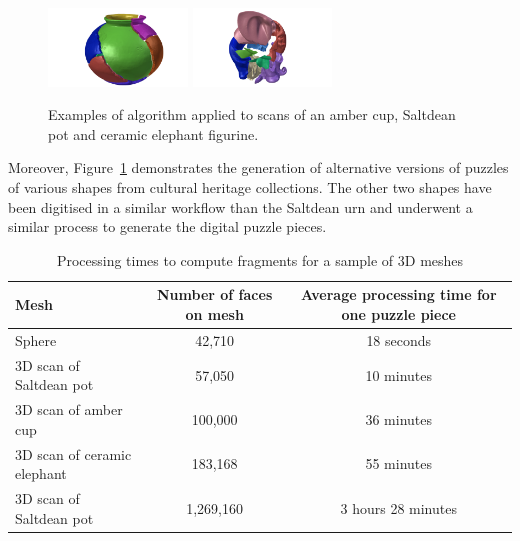 \documentclass[acmlarge,screen,dvipsnames]{acmart}
\begin{document}
\begin{figure}[htb]
  \includegraphics[width=0.33\textwidth]{images/saltdeanpuzzle4}%
  \includegraphics[width=0.33\textwidth]{images/elephantpuzzle4}
  \caption{\label{fig:three-shapes-with-different-fractures}%
    Examples of algorithm applied to scans of an amber cup, Saltdean pot and
    ceramic elephant figurine.}
\end{figure}

Moreover, Figure~\ref{fig:three-shapes-with-different-fractures}
demonstrates the generation of alternative versions of puzzles of
various shapes from cultural heritage collections. The other two
shapes have been digitised in a similar workflow than the Saltdean urn
and underwent a similar process to generate the digital puzzle pieces.




\begin{table}
  \centering
\greenBegin
\begin{tabular}{ |l|c|c| } 
 \hline
 Mesh & Number of faces on mesh & Average processing time for one puzzle piece
 \\ 
 \hline 
 Sphere & \phantom{0,0}42,710 & 18 seconds \\ 
 3D scan of Saltdean pot & \phantom{0,0}57,050 & 10 minutes \\ 
 3D scan of amber cup & \phantom{0,}100,000 & 36 minutes \\ 
 3D scan of ceramic elephant & \phantom{0,}183,168 & 55 minutes \\ 
 3D scan of Saltdean pot & 1,269,160 & 3 hours 28 minutes \\ 
 \hline
\end{tabular}
\caption{\label{table-procesingtimes} Processing times to compute fragments for a sample of 3D meshes}
\greenEnd
\end{table}
\end{document}

